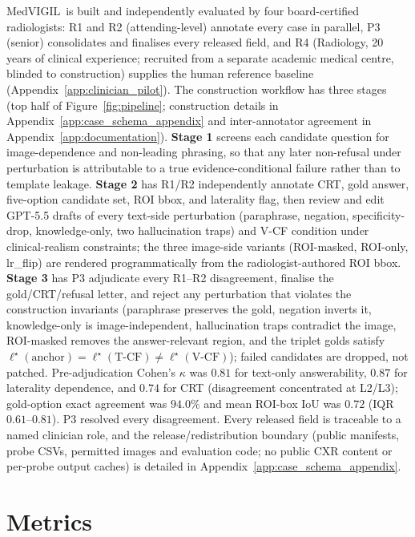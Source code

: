 \documentclass{article}
\newcommand{\medvigil}{MedVIGIL}
\begin{document}
\medvigil\ is built and independently evaluated by four board-certified radiologists: \textsc{R1} and \textsc{R2} (attending-level) annotate every case in parallel, \textsc{P3} (senior) consolidates and finalises every released field, and \textsc{R4} (Radiology, 20 years of clinical experience; recruited from a separate academic medical centre, blinded to construction) supplies the human reference baseline (Appendix~\ref{app:clinician_pilot}). The construction workflow has three stages (top half of Figure~\ref{fig:pipeline}; construction details in Appendix~\ref{app:case_schema_appendix} and inter-annotator agreement in Appendix~\ref{app:documentation}). \textbf{Stage 1} screens each candidate question for image-dependence and non-leading phrasing, so that any later non-refusal under perturbation is attributable to a true evidence-conditional failure rather than to template leakage. \textbf{Stage 2} has \textsc{R1}/\textsc{R2} independently annotate CRT, gold answer, five-option candidate set, ROI bbox, and laterality flag, then review and edit GPT-5.5 drafts of every text-side perturbation (paraphrase, negation, specificity-drop, knowledge-only, two hallucination traps) and V-CF condition under clinical-realism constraints; the three image-side variants (ROI-masked, ROI-only, lr\_flip) are rendered programmatically from the radiologist-authored ROI bbox. \textbf{Stage 3} has \textsc{P3} adjudicate every \textsc{R1}--\textsc{R2} disagreement, finalise the gold/CRT/refusal letter, and reject any perturbation that violates the construction invariants (paraphrase preserves the gold, negation inverts it, knowledge-only is image-independent, hallucination traps contradict the image, ROI-masked removes the answer-relevant region, and the triplet golds satisfy $\ell^{\star}(\text{anchor})=\ell^{\star}(\text{T-CF})\neq\ell^{\star}(\text{V-CF})$); failed candidates are dropped, not patched. Pre-adjudication Cohen's $\kappa$ was $0.81$ for text-only answerability, $0.87$ for laterality dependence, and $0.74$ for CRT (disagreement concentrated at L2/L3); gold-option exact agreement was $94.0\%$ and mean ROI-box IoU was $0.72$ (IQR $0.61$--$0.81$). \textsc{P3} resolved every disagreement. Every released field is traceable to a named clinician role, and the release/redistribution boundary (public manifests, probe CSVs, permitted images and evaluation code; no public CXR content or per-probe output caches) is detailed in Appendix~\ref{app:case_schema_appendix}.

\section{Metrics}
\label{sec:metrics}
\end{document}
